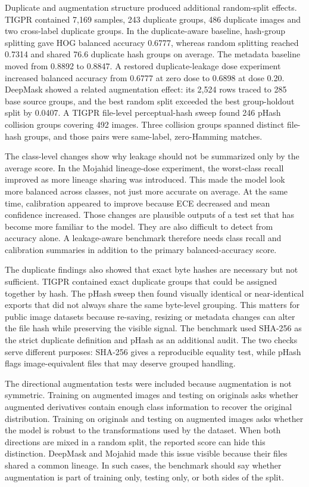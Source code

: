 \documentclass[]{interact}
\begin{document}
Duplicate and augmentation structure produced additional random-split effects. TIGPR contained 7,169 samples, 243 duplicate groups, 486 duplicate images and two cross-label duplicate groups. In the duplicate-aware baseline, hash-group splitting gave HOG balanced accuracy 0.6777, whereas random splitting reached 0.7314 and shared 76.6 duplicate hash groups on average. The metadata baseline moved from 0.8892 to 0.8847. A restored duplicate-leakage dose experiment increased balanced accuracy from 0.6777 at zero dose to 0.6898 at dose 0.20. DeepMask showed a related augmentation effect: its 2,524 rows traced to 285 base source groups, and the best random split exceeded the best group-holdout split by 0.0407. A TIGPR file-level perceptual-hash sweep found 246 pHash collision groups covering 492 images. Three collision groups spanned distinct file-hash groups, and those pairs were same-label, zero-Hamming matches.

The class-level changes show why leakage should not be summarized only by the average score. In the Mojahid lineage-dose experiment, the worst-class recall improved as more lineage sharing was introduced. This made the model look more balanced across classes, not just more accurate on average. At the same time, calibration appeared to improve because ECE decreased and mean confidence increased. Those changes are plausible outputs of a test set that has become more familiar to the model. They are also difficult to detect from accuracy alone. A leakage-aware benchmark therefore needs class recall and calibration summaries in addition to the primary balanced-accuracy score.

The duplicate findings also showed that exact byte hashes are necessary but not sufficient. TIGPR contained exact duplicate groups that could be assigned together by hash. The pHash sweep then found visually identical or near-identical exports that did not always share the same byte-level grouping. This matters for public image datasets because re-saving, resizing or metadata changes can alter the file hash while preserving the visible signal. The benchmark used SHA-256 as the strict duplicate definition and pHash as an additional audit. The two checks serve different purposes: SHA-256 gives a reproducible equality test, while pHash flags image-equivalent files that may deserve grouped handling.

The directional augmentation tests were included because augmentation is not symmetric. Training on augmented images and testing on originals asks whether augmented derivatives contain enough class information to recover the original distribution. Training on originals and testing on augmented images asks whether the model is robust to the transformations used by the dataset. When both directions are mixed in a random split, the reported score can hide this distinction. DeepMask and Mojahid made this issue visible because their files shared a common lineage. In such cases, the benchmark should say whether augmentation is part of training only, testing only, or both sides of the split.
\end{document}
